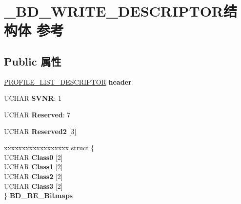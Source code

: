 \hypertarget{struct___b_d___w_r_i_t_e___d_e_s_c_r_i_p_t_o_r}{}\section{\+\_\+\+B\+D\+\_\+\+W\+R\+I\+T\+E\+\_\+\+D\+E\+S\+C\+R\+I\+P\+T\+O\+R结构体 参考}
\label{struct___b_d___w_r_i_t_e___d_e_s_c_r_i_p_t_o_r}
\subsection*{Public 属性}
\begin{DoxyCompactItemize}
\item 
\mbox{\label{struct___b_d___w_r_i_t_e___d_e_s_c_r_i_p_t_o_r_ae490b5c0ef3acf36ec2aeb137b992c19}} 
\hyperlink{struct___p_r_o_f_i_l_e___l_i_s_t___d_e_s_c_r_i_p_t_o_r}{P\+R\+O\+F\+I\+L\+E\+\_\+\+L\+I\+S\+T\+\_\+\+D\+E\+S\+C\+R\+I\+P\+T\+OR} {\bfseries header}
\item 
\mbox{\label{struct___b_d___w_r_i_t_e___d_e_s_c_r_i_p_t_o_r_a0041ca8bbc29f2bc3ccbed42fa0ff2cd}} 
U\+C\+H\+AR {\bfseries S\+V\+NR}\+: 1
\item 
\mbox{\label{struct___b_d___w_r_i_t_e___d_e_s_c_r_i_p_t_o_r_a364382474cd2a7b320688d5bb0dbe456}} 
U\+C\+H\+AR {\bfseries Reserved}\+: 7
\item 
\mbox{\label{struct___b_d___w_r_i_t_e___d_e_s_c_r_i_p_t_o_r_a9394ff06f1647efe6589421c02d59657}} 
U\+C\+H\+AR {\bfseries Reserved2} \mbox{[}3\mbox{]}
\item 
\mbox{\label{struct___b_d___w_r_i_t_e___d_e_s_c_r_i_p_t_o_r_a22fe1249fe889fedd91117cd3040144f}} 
\begin{tabbing}
xx\=xx\=xx\=xx\=xx\=xx\=xx\=xx\=xx\=\kill
struct \{\\
\>UCHAR {\bfseries Class0} \mbox{[}2\mbox{]}\\
\>UCHAR {\bfseries Class1} \mbox{[}2\mbox{]}\\
\>UCHAR {\bfseries Class2} \mbox{[}2\mbox{]}\\
\>UCHAR {\bfseries Class3} \mbox{[}2\mbox{]}\\
\} {\bfseries BD\_RE\_Bitmaps}\\


\end{tabbing}
\end{DoxyCompactItemize}
